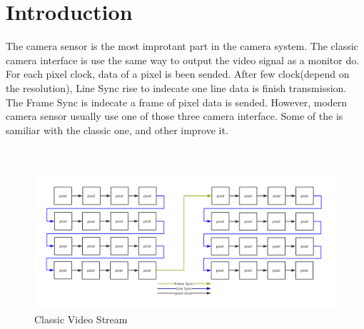 \documentclass[12pt,article]{memoir}
\begin{document}
\section{Introduction}
The camera sensor is the most improtant part in the camera system. The classic camera interface is use the same way to output the video signal as a monitor do. For each pixel clock, data of a pixel is been sended. After few clock(depend on the resolution), Line Sync rise to indecate one line data is finish transmission. The Frame Sync is indecate a frame of pixel data is sended. However, modern camera sensor usually use one of those three camera interface. Some of the is samiliar with the classic one, and other improve it.\\\\\
\begin{figure}[htp]
\includegraphics[width=\textwidth]{img/DR00002_Cam.png}
 \caption{Classic Video Stream}	
\end{figure}
\newpage
\end{document}
